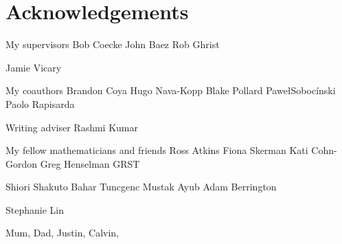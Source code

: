 \section*{Acknowledgements}

My supervisors
Bob Coecke
John Baez
Rob Ghrist

Jamie Vicary

My coauthors
Brandon Coya
Hugo Nava-Kopp
Blake Pollard
Pawe\l Soboc\'inski
Paolo Rapisarda

Writing adviser Rashmi Kumar

My fellow mathematicians and friends
Ross Atkins
Fiona Skerman
Kati Cohn-Gordon
Greg Henselman
GRST 

Shiori Shakuto
Bahar Tuncgenc
Mustak Ayub
Adam Berrington


Stephanie Lin

Mum, Dad, Justin, Calvin,

